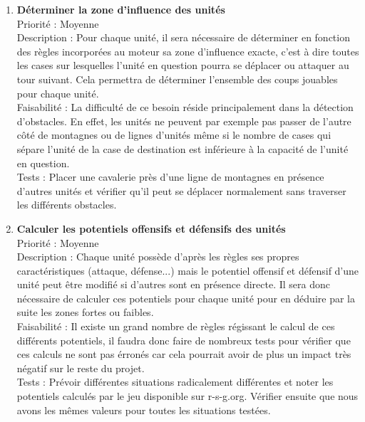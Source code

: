 \documentclass[12pt]{article}
\begin{document}
			\begin{enumerate}

				\item \textbf{Déterminer la zone d'influence des unités} \\[0.7\baselineskip]
				Priorité : Moyenne \\[0.7\baselineskip]
				Description : Pour chaque unité, il sera nécessaire de déterminer en fonction des règles incorporées au moteur sa zone d'influence exacte, c'est à dire toutes les cases sur lesquelles l'unité en question pourra se déplacer ou attaquer au tour suivant. Cela permettra de déterminer l'ensemble des coups jouables pour chaque unité. \\[0.7\baselineskip]
				Faisabilité : La difficulté de ce besoin réside principalement dans la détection d'obstacles. En effet, les unités ne peuvent par exemple pas passer de l'autre côté de montagnes ou de lignes d'unités même si le nombre de cases qui sépare l'unité de la case de destination est inférieure à la capacité de l'unité en question. \\[0.7\baselineskip]
				Tests : Placer une cavalerie près d'une ligne de montagnes en présence d'autres unités et vérifier qu'il peut se déplacer normalement sans traverser les différents obstacles. \\[0.7\baselineskip]

				\item \textbf{Calculer les potentiels offensifs et défensifs des unités} \\[0.7\baselineskip]
				Priorité : Moyenne \\[0.7\baselineskip]
				Description : Chaque unité possède d'après les règles ses propres caractéristiques (attaque, défense...) mais le potentiel offensif et défensif d'une unité peut être modifié si d'autres sont en présence directe. Il sera donc nécessaire de calculer ces potentiels pour chaque unité pour en déduire par la suite les zones fortes ou faibles. \\[0.7\baselineskip]
				Faisabilité : Il existe un grand nombre de règles régissant le calcul de ces différents potentiels, il faudra donc faire de nombreux tests pour vérifier que ces calculs ne sont pas érronés car cela pourrait avoir de plus un impact très négatif sur le reste du projet. \\[0.7\baselineskip]
				Tests : Prévoir différentes situations radicalement différentes et noter les potentiels calculés par le jeu disponible sur r-s-g.org. Vérifier ensuite que nous avons les mêmes valeurs pour toutes les situations testées. \\[0.7\baselineskip]


\end{enumerate}
\end{document}
